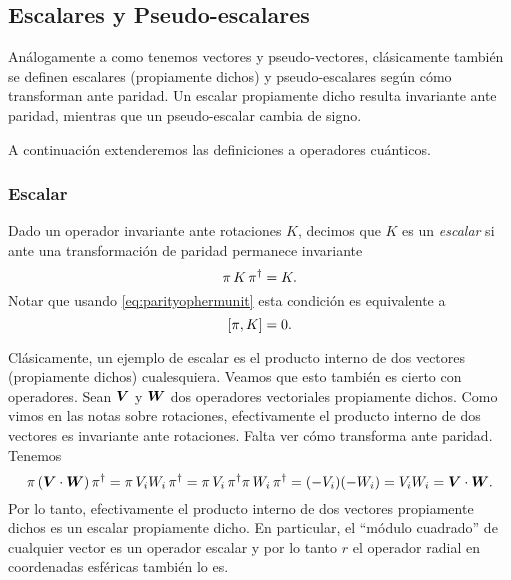 \documentclass[10pt, a4paper]{article}
\numberwithin{equation}{subsection}
\begin{document}
\subsection{Escalares y Pseudo-escalares}

Análogamente a como tenemos vectores y pseudo-vectores, clásicamente también se
definen escalares (propiamente dichos) y pseudo-escalares según cómo
transforman ante paridad. Un escalar propiamente dicho resulta invariante ante
paridad, mientras que un pseudo-escalar cambia de signo.

A continuación extenderemos las definiciones a operadores cuánticos.

\subsubsection{Escalar}
Dado un operador invariante ante rotaciones $K$, decimos que $K$ es un
\emph{escalar} si ante una transformación de paridad permanece invariante
\begin{equation} \label{eq:defscalar}
  \pi\,K\,\pi^\dagger = K.
\end{equation}
Notar que usando \eqref{eq:parityophermunit} esta condición es equivalente a
\begin{equation} \label{eq:defscalarcomm}
  \comm{\parityop}{K} = 0.
\end{equation}

Clásicamente, un ejemplo de escalar es el producto interno de dos vectores
(propiamente dichos) cualesquiera. Veamos que esto también es cierto con
operadores. Sean $\vb*{V}$ y $\vb*{W}$ dos operadores vectoriales
propiamente dichos. Como vimos en las notas sobre rotaciones, efectivamente el
producto interno de dos vectores es invariante ante rotaciones. Falta ver cómo
transforma ante paridad. Tenemos
\begin{equation}
  \pi\,(\vb*{V}\cdot\vb*{W})\,\pi^\dagger
  = \pi\,V_iW_i\,\pi^\dagger
  = \pi\,V_i\,\pi^\dagger\pi\,W_i\,\pi^\dagger
  = (-V_i)(-W_i) = V_iW_i = \vb*{V}\cdot\vb*{W}.
\end{equation}
Por lo tanto, efectivamente el producto interno de dos vectores propiamente
dichos es un escalar propiamente dicho. En particular, el ``módulo cuadrado''
de cualquier vector es un operador escalar y por lo tanto $r$ el operador
radial en coordenadas esféricas también lo es.
\end{document}
